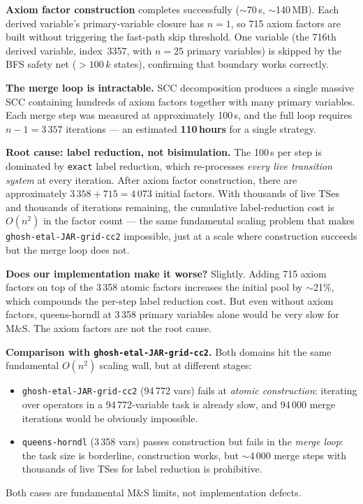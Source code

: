 \documentclass[11pt,a4paper]{article}
\begin{document}
    \textbf{Axiom factor construction} completes successfully ($\sim$70\,s,
    $\sim$140\,MB).  Each derived variable's primary-variable closure
    has $n = 1$, so 715 axiom factors are built without triggering the
    fast-path skip threshold.  One variable (the 716th derived variable,
    index~3357, with $n = 25$ primary variables) is skipped by the
    BFS safety net ($>100\,k$ states), confirming that boundary works
    correctly.

    \textbf{The merge loop is intractable.}  SCC decomposition
    produces a single massive SCC containing hundreds of axiom factors
    together with many primary variables.  Each merge step was measured
    at approximately 100\,s, and the full loop requires $n - 1 = 3\,357$
    iterations — an estimated \textbf{110\,hours} for a single strategy.

    \textbf{Root cause: label reduction, not bisimulation.}  The 100\,s
    per step is dominated by \texttt{exact} label reduction, which
    re-processes \emph{every live transition system} at every iteration.
    After axiom factor construction, there are approximately $3\,358 +
    715 = 4\,073$ initial factors.  With thousands of live TSes and
    thousands of iterations remaining, the cumulative label-reduction
    cost is $O(n^2)$ in the factor count — the same fundamental scaling
    problem that makes \texttt{ghosh-etal-JAR-grid-cc2} impossible, just
    at a scale where construction succeeds but the merge loop does not.

    \textbf{Does our implementation make it worse?}  Slightly.  Adding
    715 axiom factors on top of the 3\,358 atomic factors increases the
    initial pool by $\sim$21\%, which compounds the per-step label
    reduction cost.  But even without axiom factors, queens-horndl at
    3\,358 primary variables alone would be very slow for M\&S.  The
    axiom factors are not the root cause.

    \textbf{Comparison with \texttt{ghosh-etal-JAR-grid-cc2}.}  Both
    domains hit the same fundamental $O(n^2)$ scaling wall, but at
    different stages:
    \begin{itemize}
      \item \texttt{ghosh-etal-JAR-grid-cc2} (94\,772 vars) fails at
            \emph{atomic construction}: iterating over operators in a
            94\,772-variable task is already slow, and 94\,000 merge
            iterations would be obviously impossible.
      \item \texttt{queens-horndl} (3\,358 vars) passes construction
            but fails in the \emph{merge loop}: the task size is
            borderline, construction works, but $\sim$4\,000 merge
            steps with thousands of live TSes for label reduction is
            prohibitive.
    \end{itemize}
    Both cases are fundamental M\&S limits, not implementation defects.
\end{document}
